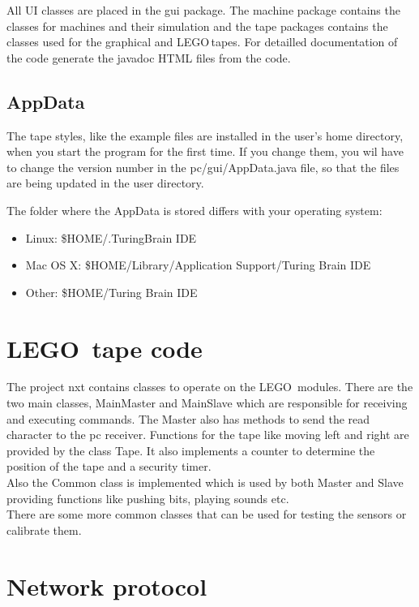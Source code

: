 \documentclass[%
  a4paper,%
  11pt,%
  blue,%
  hyperref	%
  ]{tubsartcl}
\begin{document}
All UI classes are placed in the gui package. The machine package contains the classes for machines and their simulation and the tape packages contains the classes used for the graphical and LEGO\textregistered\,tapes. For detailled documentation of the code generate the javadoc HTML files from the code.

\subsection{AppData}

The tape styles, like the example files are installed in the user's home directory, when you start the program for the first time. If you change them, you wil have to change the version number in the pc/gui/AppData.java file, so that the files are being updated in the user directory.


The folder where the AppData is stored differs with your operating system:

\begin{itemize}
\item Linux: \$HOME/.TuringBrain IDE
\item Mac OS X: \$HOME/Library/Application Support/Turing Brain IDE
\item Other: \$HOME/Turing Brain IDE
\end{itemize}

\section{LEGO\textregistered\, tape code}
\label{sec:lego}

The project nxt contains classes to operate on the LEGO\textregistered\, modules. There are the two main classes, MainMaster and MainSlave which are responsible for receiving and executing commands. The Master also has methods to send the read character to the pc receiver. Functions for the tape like moving left and right are provided by the class Tape. It also implements a counter to determine the position of the tape and a security timer. \\
Also the Common class is implemented which is used by both Master and Slave providing functions like pushing bits, playing sounds etc.\\
There are some more common classes that can be used for testing the sensors or calibrate them.

\section{Network protocol}
\end{document}
